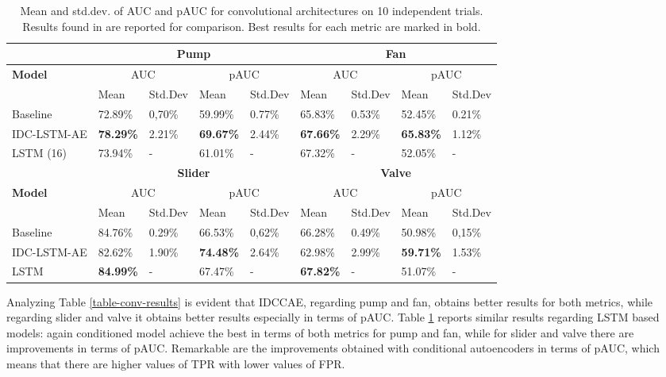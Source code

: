 \begin{table}[ht]
\small
\centering
\begin{tabular}{|m{2.8cm}|m{1.2cm}|m{1.25cm}|m{1.2cm}|m{1.25cm}|m{1.2cm}|m{1.25cm}|m{1.2cm}|m{1.25cm}|} 
\cline{2-9}
\multicolumn{1}{c|}{} & \multicolumn{4}{c|}{\textbf{Pump}} & \multicolumn{4}{c|}{\textbf{Fan}} \\ 
\hline
\multirow{2}{*}{\textbf{Model}} & \multicolumn{2}{c|}{AUC} & \multicolumn{2}{c|}{pAUC} & \multicolumn{2}{c|}{AUC} & \multicolumn{2}{c|}{pAUC} \\ 
\cline{2-9}
 & Mean & Std.Dev & Mean & Std.Dev & Mean & Std.Dev & Mean & Std.Dev \\ 
\hline
Baseline & 72.89\% & 0,70\%~ & 59.99\% & 0.77\% & 65.83\% & 0.53\% & 52.45\% & 0.21\% \\ 
\hline
IDC-LSTM-AE & \textbf{78.29\%} & 2.21\% & \textbf{69.67\%} & 2.44\% & \textbf{67.66\%} & 2.29\% & \textbf{65.83\%} & 1.12\% \\ 
\hline
LSTM (16) & 73.94\% & - & 61.01\% & - & 67.32\% & - & 52.05\% & - \\ 
\hline
\multicolumn{1}{c|}{} & \multicolumn{4}{c|}{\textbf{Slider}} & \multicolumn{4}{c|}{\textbf{Valve}} \\ 
\hline
\multirow{2}{*}{\textbf{Model}} & \multicolumn{2}{c|}{AUC} & \multicolumn{2}{c|}{pAUC} & \multicolumn{2}{c|}{AUC} & \multicolumn{2}{c|}{pAUC} \\ 
\cline{2-9}
 & Mean & Std.Dev & Mean & Std.Dev & Mean & Std.Dev & Mean & Std.Dev \\ 
\hline
Baseline & 84.76\% & 0.29\% & 66.53\% & 0,62\%~ & 66.28\% & 0.49\% & 50.98\% & 0,15\%~ \\ 
\hline
IDC-LSTM-AE & 82.62\% & 1.90\% & \textbf{74.48\%} & 2.64\% & 62.98\% & 2.99\% & \textbf{59.71\%} & 1.53\% \\ 
\hline
LSTM \cite{16LSTMDeepAutoencodersForASDtask} & \textbf{84.99\%} & - & 67.47\% & - & \textbf{67.82\%} & - & 51.07\% & - \\
\hline
\end{tabular}
\caption{Mean and std.dev. of AUC and pAUC for convolutional architectures on 10 independent trials. Results found in \cite{16LSTMDeepAutoencodersForASDtask} are reported for comparison. Best results for each metric are marked in bold. }
\label{table-lstm-results}
\end{table}

Analyzing Table \ref{table-conv-results} is evident that IDCCAE, regarding pump and fan,  obtains better results for both metrics, while regarding slider and valve it obtains better results especially in terms of pAUC. Table \ref{table-lstm-results} reports similar results regarding LSTM based models: again conditioned model achieve the best in terms of both metrics for pump and fan, while for slider and valve there are improvements in terms of pAUC. Remarkable are the improvements obtained with conditional autoencoders in terms of pAUC, which means that there are higher values of TPR with lower values of FPR.

